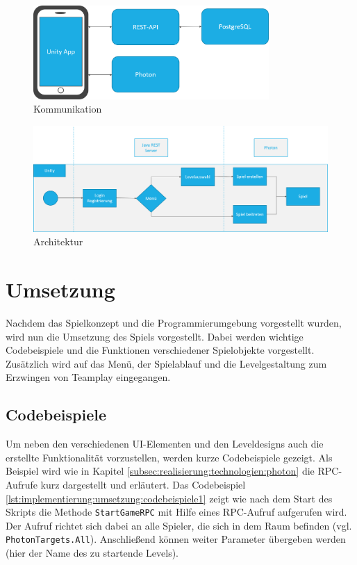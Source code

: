 \begin{figure}[H]
    \begin{center}
      \includegraphics[width=0.8\textwidth]{img/realisierung/Kommunikation}
      \caption{Kommunikation}
      \label{fig:realisierung:technologien:kommunikation}
    \end{center}
\end{figure}

\begin{figure}[H]
    \begin{center}
      \includegraphics[width=\linewidth]{img/realisierung/Architektur2}
      \caption{Architektur}
      \label{fig:realisierung:technologien:architektur}
    \end{center}
\end{figure}

\section{Umsetzung}
\label{sec:grundlagen:umsetzung}
Nachdem das Spielkonzept und die Programmierumgebung vorgestellt wurden, wird nun die Umsetzung des Spiels vorgestellt. Dabei werden wichtige Codebeispiele und die Funktionen verschiedener Spielobjekte vorgestellt. Zusätzlich wird auf das Menü, der Spielablauf und die Levelgestaltung zum Erzwingen von Teamplay eingegangen.

\subsection{Codebeispiele}
\label{subsec:implementierung:umsetzung:codebeispiele}
Um neben den verschiedenen UI-Elementen und den Leveldesigns auch die erstellte Funktionalität vorzustellen, werden kurze Codebeispiele gezeigt. Als Beispiel wird wie in Kapitel \ref{subsec:realisierung:technologien:photon} die RPC-Aufrufe kurz dargestellt und erläutert. Das Codebeispiel \ref{lst:implementierung:umsetzung:codebeispiele1} zeigt wie nach dem Start des Skripts die Methode \texttt{StartGameRPC} mit Hilfe eines RPC-Aufruf aufgerufen wird. Der Aufruf richtet sich dabei an alle Spieler, die sich in dem Raum befinden (vgl. \texttt{PhotonTargets.All}). Anschließend können weiter Parameter übergeben werden (hier der Name des zu startende Levels).

